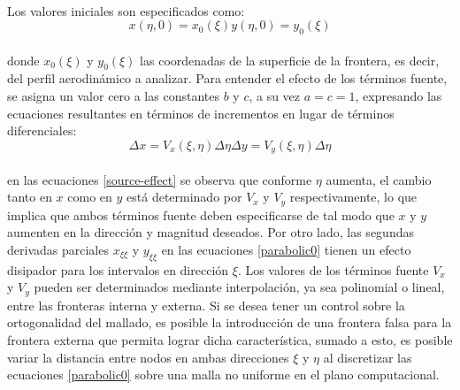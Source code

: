 \documentclass[letterpaper, openright, 12pt]{book}
\begin{document}
	\paragraph*{}
		Los valores iniciales son especificados como:
		\begin{subequations}
			\begin{equation}
				x(\eta, 0) = x_0(\xi)
			\end{equation}
			\begin{equation}
				y(\eta, 0) = y_0(\xi)
			\end{equation}
		\end{subequations}\\
		donde $x_0(\xi)$ y $y_0(\xi)$ las coordenadas de la superficie de la frontera, es decir, del perfil aerodinámico a analizar. Para entender el efecto de los términos fuente, se asigna un valor cero a las constantes $b$ y $c$, a su vez $a = c = 1$, expresando las ecuaciones resultantes en términos de incrementos en lugar de términos diferenciales:
		\begin{subequations}
			\begin{equation}
				\Delta x = V_x(\xi, \eta) \Delta \eta
			\end{equation}
			\begin{equation}
				\Delta y = V_y(\xi, \eta) \Delta \eta
			\end{equation}
			\label{source-effect}
		\end{subequations}\\
		en las ecuaciones \ref{source-effect} se observa que conforme $\eta$ aumenta, el cambio tanto en $x$ como en $y$ está determinado por $V_x$ y $V_y$ respectivamente, lo que implica que ambos términos fuente deben especificarse de tal modo que $x$ y $y$ aumenten en la dirección y magnitud deseados. Por otro lado, las segundas derivadas parciales $x_{\xi\xi}$ y $y_{\xi\xi}$ en las ecuaciones \ref{parabolic0} tienen un efecto disipador para los intervalos en dirección $\xi$. Los valores de los términos fuente $V_x$ y $V_y$ pueden ser determinados mediante interpolación, ya sea polinomial o lineal, entre las fronteras interna y externa. Si se desea tener un control sobre la ortogonalidad del mallado, es posible la introducción de una frontera falsa para la frontera externa que permita lograr dicha característica, sumado a esto, es posible variar la distancia entre nodos en ambas direcciones $\xi$ y $\eta$ al discretizar las ecuaciones \ref{parabolic0} sobre una malla no uniforme en el plano computacional.
	
\end{document}
